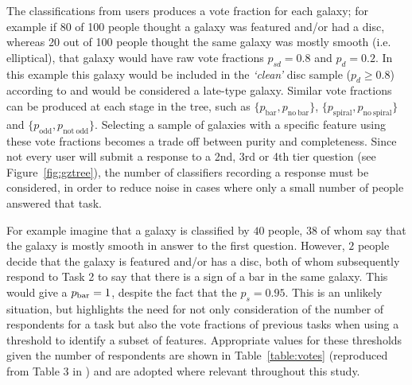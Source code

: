 
The classifications from users produces a vote fraction for each galaxy; for example if 80 of 100 people thought a galaxy was featured and/or had a disc, whereas 20 out of 100 people thought the same galaxy was mostly smooth (i.e. elliptical), that galaxy would have raw vote fractions $p_{sd} = 0.8$ and $p_{d} = 0.2$. In this example this galaxy would be included in the \emph{`clean'} disc sample ($p_d \geq 0.8$) according to \cite{GZ2} and would be considered a late-type galaxy. Similar vote fractions can be produced at each stage in the tree, such as $\{p_{\mathrm{bar}}, p_{\mathrm{no~bar}}\}$, $\{p_{\mathrm{spiral}}, p_{\mathrm{no~spiral}}\}$ and $\{p_{\mathrm{odd}}, p_{\mathrm{not~odd}}\}$. Selecting a sample of galaxies with a specific feature using these vote fractions becomes a trade off between purity and completeness. Since not every user will submit a response to a 2nd, 3rd or 4th tier question (see Figure~\ref{fig:gztree}), the number of classifiers recording a response must be considered, in order to reduce noise in cases where only a small number of people answered that task. 

For example imagine that a galaxy is classified by $40$ people, $38$ of whom say that the galaxy is mostly smooth in answer to the first question. However, $2$ people decide that the galaxy is featured and/or has a disc, both of whom subsequently respond to Task 2 to say that there is a sign of a bar in the same galaxy. This would give a $p_{\rm{bar}}=1$, despite the fact that the $p_s = 0.95$. This is an unlikely situation, but highlights the need for not only consideration of the number of respondents for a task but also the vote fractions of previous tasks when using a threshold to identify a subset of features. Appropriate values for these thresholds given the number of respondents are shown in Table~\ref{table:votes} (reproduced from Table 3 in \citealt{GZ2}) and are adopted where relevant throughout this study. 

